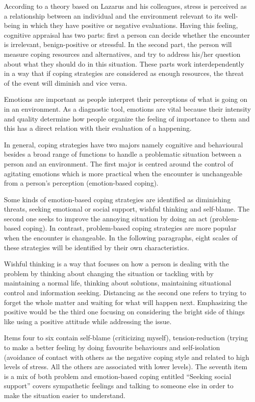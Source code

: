 \documentclass[
11pt, %
oneside, %
english, %
singlespacing, %
]{macthesis} %
\begin{document}
According to a theory based on Lazarus and his colleagues, stress is perceived as a relationship between an individual and the environment relevant to its well-being in which they have positive or negative evaluations. Having this feeling, cognitive appraisal has two parts: first a person can decide whether the encounter is irrelevant, benign-positive or stressful. In the second part, the person will measure coping resources and alternatives, and try to address his/her question about what they should do in this situation. These parts work interdependently in a way that if coping strategies are considered as enough resources, the threat of the event will diminish and vice versa.

Emotions are important as people interpret their perceptions of what is going on in an environment. As a diagnostic tool, emotions are vital because their intensity and quality determine how people organize the feeling of importance to them and this has a direct relation with their evaluation of a happening.

In general, coping strategies have two majors namely cognitive and behavioural besides a broad range of functions to handle a problematic situation between a person and an environment. The first major is centred around the control of agitating emotions which is more practical when the encounter is unchangeable from a person's perception (emotion-based coping).

Some kinds of emotion-based coping strategies are identified as diminishing threats, seeking emotional or social support, wishful thinking and self-blame. The second one seeks to improve the annoying situation by doing an act (problem-based coping). In contrast, problem-based coping strategies are more popular when the encounter is changeable. In the following paragraphs, eight scales of these strategies will be identified by their own characteristics.

Wishful thinking is a way that focuses on how a person is dealing with the problem by thinking about changing the situation or tackling with by maintaining a normal life, thinking about solutions, maintaining situational control and information seeking. Distancing as the second one refers to trying to forget the whole matter and waiting for what will happen next. Emphasizing the positive would be the third one focusing on considering the bright side of things like using a positive attitude while addressing the issue.

Items four to six contain self-blame (criticizing myself), tension-reduction (trying to make a better feeling by doing favourite behaviours and self-isolation (avoidance of contact with others as the negative coping style and related to high levels of stress. All the others are associated with lower levels). The seventh item is a mix of both problem and emotion-based coping entitled ``Seeking social support'' covers sympathetic feelings and talking to someone else in order to make the situation easier to understand.
\end{document}

